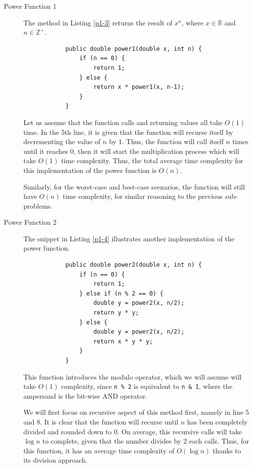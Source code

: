 \documentclass{report}
\begin{document}
\begin{description}
	\item[Power Function 1] The method in Listing \ref{p1-3} returns the result of $x^n$, where $x \in \mathbb{R}$ and $n \in \mathbb{Z}^+$.
	\begin{listing}[h]
		\begin{verbatim}
			public double power1(double x, int n) {
				if (n == 0) {
					return 1;
				} else {
					return x * power1(x, n-1);
				}
			}
		\end{verbatim}
		\caption{Code provided.}
		\label{p1-3}
	\end{listing}
	
	Let us assume that the function calls and returning values all take $O(1)$ time. In the 5th line, it is given that the function will recurse itself by decrementing the value of $n$ by 1. Thus, the function will call itself $n$ times until it reaches $0$, then it will start the multiplication process which will take $O(1)$ time complexity. Thus, the total average time complexity for this implementation of the power function is $O(n)$.
	
	Similarly, for the worst-case and best-case scenarios, the function will still have $O(n)$ time complexity, for similar reasoning to the previous sub-problems.
	
	\item[Power Function 2] The snippet in Listing \ref{p1-4} illustrates another implementation of the power function.
	\begin{listing}[h]
		\begin{verbatim}
			public double power2(double x, int n) {
				if (n == 0) {
					return 1;
				} else if (n % 2 == 0) {
					double y = power2(x, n/2);
					return y * y;
				} else {
					double y = power2(x, n/2);
					return x * y * y;
				}
			}
		\end{verbatim}
		\caption{Code provided.}
		\label{p1-4}
	\end{listing}
	
	This function introduces the modulo operator, which we will assume will take $O(1)$ complexity, since \lstinline|n % 2| is equivalent to \lstinline|n & 1|, where the ampersand is the bit-wise AND operator.
	
	We will first focus on recursive aspect of this method first, namely in line 5 and 8. It is clear that the function will recurse until $n$ has been completely divided and rounded down to $0$. On average, this recursive calls will take $\log n$ to complete, given that the number divides by 2 each calls. Thus, for this function, it has an average time complexity of $O(\log n)$ thanks to its division approach.
	

\end{description}
\end{document}
